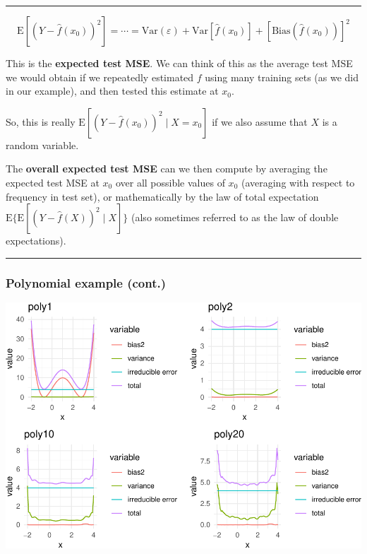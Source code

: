 \documentclass[]{article}
\begin{document}
\begin{center}\rule{0.5\linewidth}{\linethickness}\end{center}

\[\text{E}[(Y - \hat{f}(x_0))^2]=\cdots=\text{Var}(\varepsilon) +  \text{Var}[\hat{f}(x_0)]+[\text{Bias}(\hat{f}(x_0))]^2\]

This is the \textbf{expected test MSE}. We can think of this as the
average test MSE we would obtain if we repeatedly estimated \(f\) using
many training sets (as we did in our example), and then tested this
estimate at \(x_0\).

So, this is really \(\text{E}[(Y - \hat{f}(x_0))^2 \mid X=x_0]\) if we
also assume that \(X\) is a random variable.

The \textbf{overall expected test MSE} can we then compute by averaging
the expected test MSE at \(x_0\) over all possible values of \(x_0\)
(averaging with respect to frequency in test set), or mathematically by
the law of total expectation
\(\text{E} \{ \text{E}[(Y - \hat{f}(X))^2 \mid X]\}\) (also sometimes
referred to as the law of double expectations).

\begin{center}\rule{0.5\linewidth}{\linethickness}\end{center}

\hypertarget{polynomial-example-cont.}{%
\subsubsection{Polynomial example
(cont.)}\label{polynomial-example-cont.}}

\includegraphics{2StatLearn_files/figure-latex/biasvarianceforx-1.pdf}
\end{document}
